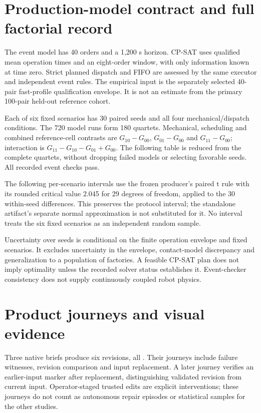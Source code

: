 \section{Production-model contract and full factorial record}
The event model has 40 orders and a 1,200 s horizon. CP-SAT uses qualified mean operation times and an eight-order window, with only information known at time zero. Strict planned dispatch and FIFO are assessed by the same executor and independent event rules. The empirical input is the separately selected 40-pair fast-profile qualification envelope. It is not an estimate from the primary 100-pair held-out reference cohort.

Each of six fixed scenarios has 30 paired seeds and all four mechanical/dispatch conditions. The 720 model runs form 180 quartets. Mechanical, scheduling and combined reference-cell contrasts are $G_{10}-G_{00}$, $G_{01}-G_{00}$ and $G_{11}-G_{00}$; interaction is $G_{11}-G_{10}-G_{01}+G_{00}$. The following table is reduced from the complete quartets, without dropping failed models or selecting favorable seeds. All recorded event checks pass.
\begin{center}\small\end{center}
The following per-scenario intervals use the frozen producer's paired t rule with its rounded critical value 2.045 for 29 degrees of freedom, applied to the 30 within-seed differences. This preserves the protocol interval; the standalone artifact's separate normal approximation is not substituted for it. No interval treats the six fixed scenarios as an independent random sample.
\begin{center}\small\end{center}
Uncertainty over seeds is conditional on the finite operation envelope and fixed scenarios. It excludes uncertainty in the envelope, contact-model discrepancy and generalization to a population of factories. A feasible CP-SAT plan does not imply optimality unless the recorded solver status establishes it. Event-checker consistency does not supply continuously coupled robot physics.
\begin{center}\scriptsize\end{center}

\section{Product journeys and visual evidence}
Three native briefs produce six revisions, all . Their journeys include failure witnesses, revision comparison and input replacement. A later journey verifies an earlier-input marker after replacement, distinguishing validated revision from current input. Operator-staged trusted edits are explicit interventions; these journeys do not count as autonomous repair episodes or statistical samples for the other studies.

